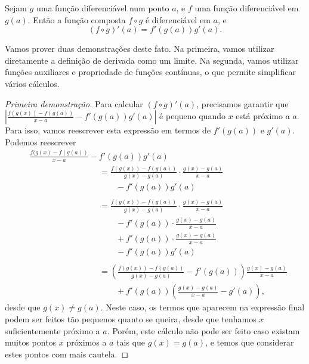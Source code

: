 \begin{theorem}
	Sejam $g$ uma função diferenciável num ponto $a$, e $f$ uma função diferenciável em $g(a)$. Então a função composta $f\circ g$ é diferenciável em $a$, e
	\[(f\circ g)'(a)=f'(g(a))g'(a).\]
\end{theorem}

Vamos prover duas demonstrações deste fato. Na primeira, vamos utilizar diretamente a definição de derivada como um limite. Na segunda, vamos utilizar funções auxiliares e propriedade de funções contínuas, o que permite simplificar vários cálculos.

\begin{proof}[Primeira demonstração]
	Para calcular $(f\circ g)'(a)$, precisamos garantir que $\left|\frac{f(g(x))-f(g(a))}{x-a}-f'(g(a))g'(a)\right|$ é pequeno quando $x$ está próximo a $a$. Para isso, vamos reescrever esta expressão em termos de $f'(g(a))$ e $g'(a)$. Podemos reescrever
	\begin{align*}
		&\frac{f(g(x)-f(g(a))}{x-a}-f'(g(a))g'(a)\\
		
			&\hspace{100pt}=\frac{f(g(x))-f(g(a))}{g(x)-g(a)}\cdot\frac{g(x)-g(a)}{x-a}\\
			&\hspace{100pt}\qquad-f'(g(a))g'(a)\\
			 & \\
			&\hspace{100pt}=\frac{f(g(x))-f(g(a))}{g(x)-g(a)}\cdot\frac{g(x)-g(a)}{x-a}\\
			&\hspace{100pt}\qquad-f'(g(a))\cdot\frac{g(x)-g(a)}{x-a}\\
			&\hspace{100pt}\qquad +f'(g(a))\cdot\frac{g(x)-g(a)}{x-a}\\
			&\hspace{100pt}\qquad-f'(g(a))g'(a)\\
			 & \\
			&\hspace{100pt}=\left(\frac{f(g(x))-f(g(a))}{g(x)-g(a)}-f'(g(a))\right)\frac{g(x)-g(a)}{x-a}\\
			&\hspace{100pt}\qquad +f'(g(a))\left(\frac{g(x)-g(a)}{x-a}-g'(a)\right),\tag{$\ast$}
	\end{align*}
	desde que $g(x)\neq g(a)$. Neste caso, os termos que aparecem na expressão final podem ser feitos tão pequenos quanto se queira, desde que tenhamos $x$ suficientemente próximo a $a$. Porém, este cálculo não pode ser feito caso existam muitos pontos $x$ próximos a $a$ tais que $g(x)=g(a)$, e temos que considerar estes pontos com mais cautela.
	

\end{proof}
